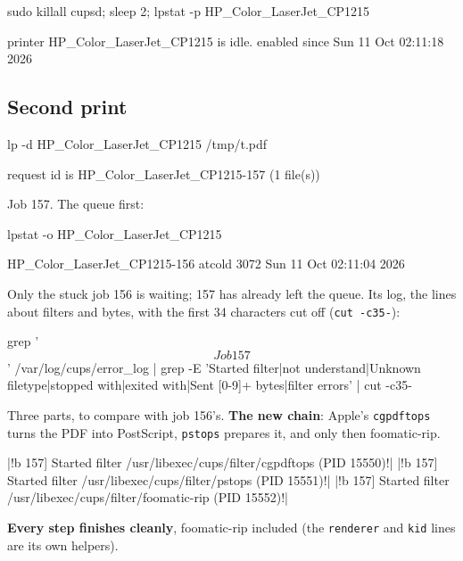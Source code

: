 \documentclass[11pt,a4paper]{article}
\begin{document}
\begin{pane}
sudo killall cupsd; sleep 2; lpstat -p HP_Color_LaserJet_CP1215
\end{pane}
\begin{cmdout}
printer HP_Color_LaserJet_CP1215 is idle.  enabled since Sun 11 Oct 02:11:18 2026
\end{cmdout}

\subsection{Second print}\label{sec:second}

\begin{pane}
lp -d HP_Color_LaserJet_CP1215 /tmp/t.pdf
\end{pane}
\begin{cmdout}
request id is HP_Color_LaserJet_CP1215-157 (1 file(s))
\end{cmdout}

Job 157. The queue first:

\begin{pane}
lpstat -o HP_Color_LaserJet_CP1215
\end{pane}
\begin{cmdout}
HP_Color_LaserJet_CP1215-156 atcold            3072   Sun 11 Oct 02:11:04 2026
\end{cmdout}

Only the stuck job 156 is waiting; 157 has already left the queue. Its log, the lines about filters and bytes, with the first 34 characters cut off (\texttt{cut -c35-}):

\begin{pane}
grep '\[Job 157\]' /var/log/cups/error_log | grep -E 'Started filter|not understand|Unknown filetype|stopped with|exited with|Sent [0-9]+ bytes|filter errors' | cut -c35-
\end{pane}
Three parts, to compare with job 156's. \textbf{The new chain}: Apple's \texttt{cgpdftops} turns the PDF into PostScript, \texttt{pstops} prepares it, and only then foomatic-rip.

\begin{cmdout}
|!b 157] Started filter /usr/libexec/cups/filter/cgpdftops (PID 15550)!|
|!b 157] Started filter /usr/libexec/cups/filter/pstops (PID 15551)!|
|!b 157] Started filter /usr/libexec/cups/filter/foomatic-rip (PID 15552)!|
\end{cmdout}

\textbf{Every step finishes cleanly}, foomatic-rip included (the \texttt{renderer} and \texttt{kid} lines are its own helpers).
\end{document}
